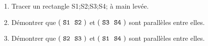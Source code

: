 \documentclass[exercice]{thedocument}%
\begin{document}
%
\begin{enumerate}
    \item Tracer un rectangle \<S1;\<S2;\<S3;\<S4; à main levée.
    \item Démontrer que $(\text{\<S1;\<S2;})$ et $(\text{\<S3;\<S4;})$ sont parallèles entre
    elles.
    \item Démontrer que $(\text{\<S2;\<S3;})$ et $(\text{\<S1;\<S4;})$ sont parallèles entre
    elles.
\end{enumerate}
\end{document}
